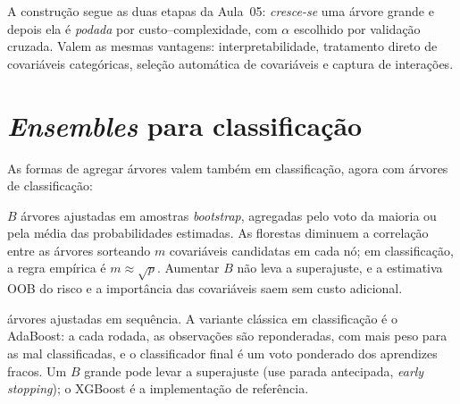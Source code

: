\documentclass[11pt,a4paper]{article}
\begin{document}
\noindent A construção segue as duas etapas da Aula~05: \emph{cresce-se} uma árvore
grande e depois ela é \emph{podada} por custo--complexidade, com $\alpha$ escolhido por
validação cruzada. Valem as mesmas vantagens: interpretabilidade, tratamento direto
de covariáveis categóricas, seleção automática de covariáveis e captura de
interações.

\section{\emph{Ensembles} para classificação}
As formas de agregar árvores valem também em classificação, agora com árvores de
classificação:
\begin{description}[leftmargin=2.6cm,style=nextline]
  \item[Bagging / Florestas] $B$ árvores ajustadas em amostras \emph{bootstrap},
        agregadas pelo voto da maioria ou pela média das probabilidades estimadas.
        As florestas diminuem a correlação entre as árvores sorteando $m$
        covariáveis candidatas em cada nó; em classificação, a regra empírica é
        $m\approx\sqrt{p}$. Aumentar $B$ não leva a superajuste, e a estimativa OOB
        do risco e a importância das covariáveis saem sem custo adicional.
  \item[Boosting] árvores ajustadas em sequência. A variante clássica em
        classificação é o AdaBoost: a cada rodada, as observações são reponderadas,
        com mais peso para as mal classificadas, e o classificador final é um voto
        ponderado dos aprendizes fracos. Um $B$ grande pode levar a superajuste (use
        parada antecipada, \emph{early stopping}); o XGBoost é a implementação de
        referência.
\end{description}

\end{document}
